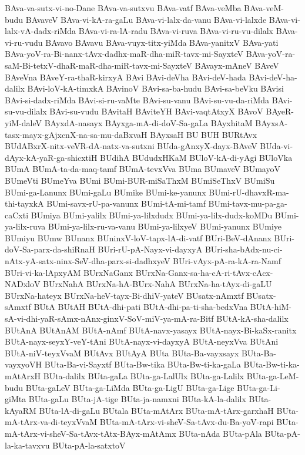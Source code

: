 {BAva-va-sutx-vi-no-Dane
BAva-va-sutxvu
BAva-vatf
BAva-veMba
BAva-veM-budu
BAvaveV
BAva-vi-kA-ra-gaLu
BAva-vi-lalx-da-vanu
BAva-vi-lalxde
BAva-vi-lalx-vA-dadx-riMda
BAva-vi-ra-lA-radu
BAva-vi-ruva
BAva-vi-ru-vu-dilalx
BAva-vi-ru-vudu
BAvavo
BAvavu
BAva-vuyx-titx-yiMda
BAva-yanitxV
BAva-yati
BAva-yoV-ra-Bi-nanx-tAvx-dadhx-maR-dha-miR-tavx-mi-SayxteV
BAva-yoV-ra-saM-Bi-tetxV-dhaR-maR-dha-miR-tavx-mi-SayxteV
BAvayx-mAneV
BAveV
BAveVna
BAveY-ra-thaR-kirxyA
BAvi
BAvi-deVha
BAvi-deV-hada
BAvi-deV-ha-dalilx
BAvi-loV-kA-timxkA
BAvinoV
BAvi-sa-ba-hudu
BAvi-sa-beVku
BAvisi
BAvi-si-dadx-riMda
BAvi-si-ru-vaMte
BAvi-su-vanu
BAvi-su-vu-da-riMda
BAvi-su-vu-dilalx
BAvi-su-vudu
BAvitaH
BAviteYH
BAvi-vaqtAtxyX
BAvoV
BAyeR-yiM-daleV
BAyxdA-nasayx
BAyxga-mA-di-doV-Sa-gaLa
BAyxhitaM
BAyxsA-tasx-mayx-gAjxcnX-na-sa-mu-daBxvaH
BAyxsaH
BU
BUH
BURtAvx
BUdABxrX-nitx-veVR-dA-natx-va-sutxni
BUda-gAnxyX-dayx-BAveV
BUda-vi-dAyx-kA-yaR-ga-shicxtiH
BUdihA
BUdudxHKaM
BUloV-kA-di-yAgi
BUloVka
BUmA
BUmA-ta-da-maq-tamf
BUmA-tevxVva
BUma
BUmaveV
BUmayoV
BUmeVti
BUmeYva
BUmi
BUmi-BUR-miSaThxM
BUmiSeThxV
BUmiSu
BUmi-ga-Lanunx
BUmi-gaLu
BUmike
BUmi-ke-yanunx
BUmi-rU-dhavxR-ma-thi-tayxkA
BUmi-savx-rU-pa-vanunx
BUmi-tA-mi-tamf
BUmi-tavx-mu-pa-ga-caCxti
BUmiya
BUmi-yalilx
BUmi-ya-lilxdudx
BUmi-ya-lilx-dudx-koMDu
BUmi-ya-lilx-ruva
BUmi-ya-lilx-ru-va-vanu
BUmi-ya-lilxyeV
BUmi-yanunx
BUmiye
BUmiyu
BUmw
BUnanx
BUninxV-loV-tapx-lA-di-vatf
BUri-BeV-dAnanx
BUri-doV-Sa-parx-da-shiRnaH
BUri-rU-pA-Nayx-vi-dayxyA
BUri-sha-bAdx-nu-ci-nAtx-yA-satx-ninx-SeV-dha-parx-si-dadhxyeV
BUri-vAyx-pA-ra-kA-ra-Namf
BUri-vi-ka-lApxyAM
BUrxNaGanx
BUrxNa-Ganx-sa-ha-cA-ri-tAvx-cAcx-NADxloV
BUrxNahA
BUrxNa-hA-BUrx-NahA
BUrxNa-ha-tAyx-di-gaLU
BUrxNa-hateyx
BUrxNa-heV-tayx-Bi-dhiV-yateV
BUsatx-nAmxtf
BUsatx-sAmxtf
BUtA
BUtAH
BUtA-dhi-pati
BUtA-dhi-pa-ti-sha-bedxVna
BUtA-hiM-sA-vi-dhi-yaR-sAmx-nAnx-ginxV-SoV-miV-ya-mA-ra-Bitf
BUtA-kA-sha-dalilx
BUtAnA
BUtAnAM
BUtA-nAmf
BUtA-navx-yasayx
BUtA-nayx-Bi-kaSx-ranitx
BUtA-nayx-seyxY-veY-tAni
BUtA-nayx-vi-dayxyA
BUtA-neyxVva
BUtAni
BUtA-niV-teyxVvaM
BUtAvx
BUtAyA
BUta
BUta-Ba-vayxsayx
BUta-Ba-vayxyoVH
BUta-Ba-vi-Sayxtf
BUta-Bw-tika
BUta-Bw-ti-ka-gaLa
BUta-Bw-ti-ka-mAtArxH
BUta-dalilx
BUta-gaLa
BUta-ga-LalUlx
BUta-ga-Lalilx
BUta-ga-LeM-budu
BUta-gaLeV
BUta-ga-LiMda
BUta-ga-LigU
BUta-ga-Lige
BUta-ga-Li-giMta
BUta-gaLu
BUta-jA-tige
BUta-ja-namxni
BUta-kA-la-dalilx
BUta-kAyaRM
BUta-lA-di-gaLu
BUtala
BUta-mAtArx
BUta-mA-tArx-garxhaH
BUta-mA-tArx-va-di-teyxVvaM
BUta-mA-tArx-vi-sheV-Sa-tAvx-du-Ba-yoV-rapi
BUta-mA-tArx-vi-sheV-Sa-tAvx-tAtx-BAyx-mAtAmx
BUta-nAda
BUta-pAla
BUta-pA-la-ka-tavxvu
BUta-pA-la-satxtoV
}
